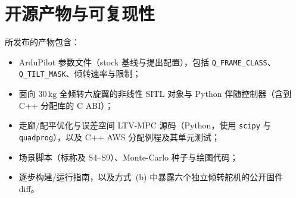 \documentclass[UTF8,a4paper,11pt]{ctexart}
\newcommand{\SI}[2]{\ensuremath{#1\,#2}}
\newcommand{\kilogram}{\mathrm{kg}}
\begin{document}
\section{开源产物与可复现性}\label{app:artifacts}
所发布的产物包含：
\begin{itemize}[leftmargin=1.6em,itemsep=2pt]
  \item ArduPilot 参数文件（stock 基线与提出配置），包括 \texttt{Q\_FRAME\_CLASS}、\texttt{Q\_TILT\_MASK}、倾转速率与限制；
  \item 面向 \SI{30}{\kilogram} 全倾转六旋翼的非线性 SITL 对象与 Python 伴随控制器（含到 C++ 分配库的 C ABI）；
  \item 走廊/配平优化与误差空间 LTV-MPC 源码（Python，使用 \texttt{scipy} 与 \texttt{quadprog}），以及 C++ AWS 分配例程及其单元测试；
  \item 场景脚本（标称及 S4--S9）、Monte-Carlo 种子与绘图代码；
  \item 逐步构建/运行指南，以及方式~(b) 中暴露六个独立倾转舵机的公开固件 diff。
\end{itemize}



\end{document}
